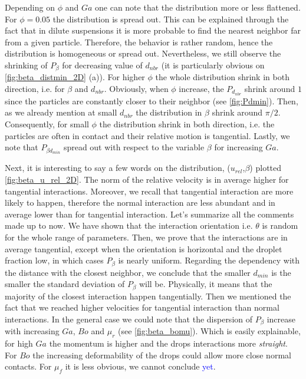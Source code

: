 Depending on $\phi$ and $Ga$ one can note that the distribution more or less flattened.   
For $\phi = 0.05$ the distribution is spread out. 
This can be explained through the fact that in dilute suspensions it is more probable to find the nearest neighbor far from a given particle. 
Therefore, the behavior is rather random, hence the distribution is homogeneous or spread out. 
Nevertheless, we still observe the shrinking of $P_\beta$ for decreasing value of $d_{nbr}$ (it is particularly obvious on \ref{fig:beta_distmin_2D} (a)). 
For higher $\phi$ the whole distribution shrink in both direction, i.e. for $\beta$ and $d_{nbr}$.
Obviously, when $\phi$ increase, the $P_{d_{nbr}}$ shrink around $1$ since the particles are constantly closer to their neighbor (see  \ref{fig:Pdmin}). 
Then, as we already mention at small $d_{nbr}$ the distribution in $\beta$ shrink around $\pi/2$.
Consequently, for small $\phi$ the distribution shrink in both direction, i.e. the particles are often in contact and their relative motion is tangential. 
Lastly, we note that $P_{\beta d_{min}}$ spread out with respect to the variable $\beta$ for increasing $Ga$. 

Next, it is interesting to say a few words on the distribution, ($u_{rel}$,$\beta$) plotted \ref{fig:beta_u_rel_2D}. 
The norm of the relative velocity is in average higher for tangential interactions.
Moreover, we recall that tangential interaction are more likely to happen, therefore the normal interaction are less abundant and in average lower than for tangential interaction. 
Let's summarize all the comments made up to now. 
We have shown that the interaction orientation i.e. $\theta$ is random for the whole range of parameters.
Then, we prove that the interactions are in average tangential, except when the orientation is horizontal and the droplet fraction low, in which cases $P_\beta$ is nearly uniform. 
Regarding the dependency with the distance with the closest neighbor, we conclude that the smaller $d_{min}$ is the smaller the standard deviation of $P_\beta$ will be. 
Physically, it means that the majority of the closest interaction happen tangentially. 
Then we mentioned the fact that we reached higher velocities for tangential interaction than normal interactions. 
In the general case we could note that the dispersion of $P_\beta$ increase with increasing $Ga$, $Bo$ and $\mu_r$ (see \ref{fig:beta_bomu}). 
Which is easily explainable, for high $Ga$ the momentum is higher and the drops interactions more \textit{straight}. 
For $Bo$ the increasing deformability of the drops could allow more close normal contacts.
For $\mu_f$ it is less obvious, we cannot conclude \textcolor{blue}{yet}. 


